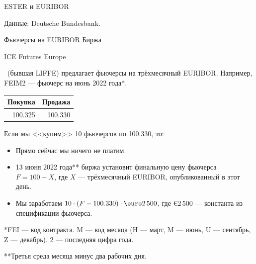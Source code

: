 \documentclass{beamer}
\renewcommand{\EUR}[1]{\textup{\euro}#1}
\newcommand{\en}[1]{\begin{otherlanguage}{english}#1\end{otherlanguage}}
\begin{document}
\begin{frame}{ESTER и EURIBOR}
\centering
{}

\scriptsize Данные: Deutsche Bundesbank.
\end{frame}



\begin{frame}{Фьючерсы на EURIBOR}
\justify
Биржа \en{ICE Futures Europe}\ (бывшая LIFFE) предлагает фьючерсы на трёхмесячный EURIBOR. Например, \alert{FEIM2} --- фьючерс на июнь 2022 года*.

\justify
\centering
\begin{tabular}{r|r}
Покупка & Продажа \\ \hline
100.325 & 100.330
\end{tabular}

\justify
Если мы <<купим>> 10 фьючерсов по 100.330, то:
\begin{itemize}
\justifying
\item Прямо сейчас мы ничего не платим.
\item 13 июня 2022 года** биржа установит финальную цену фьючерса $F = 100 - X$, где 
$X$ --- трёхмесячный EURIBOR, опубликованный в этот день.
\item Мы заработаем $10 \cdot (F - 100.330) \cdot \EUR{2\,500}$, где \EUR{2\,500} --- 
константа из спецификации фьючерса.
\end{itemize}

\justify
*FEI --- код контракта. M --- код месяца (H --- март, M --- июнь, U --- сентябрь, Z --- 
декабрь). 2 --- последняя цифра года.

\justify
**Третья среда месяца минус два рабочих дня.
\end{frame}
\end{document}
